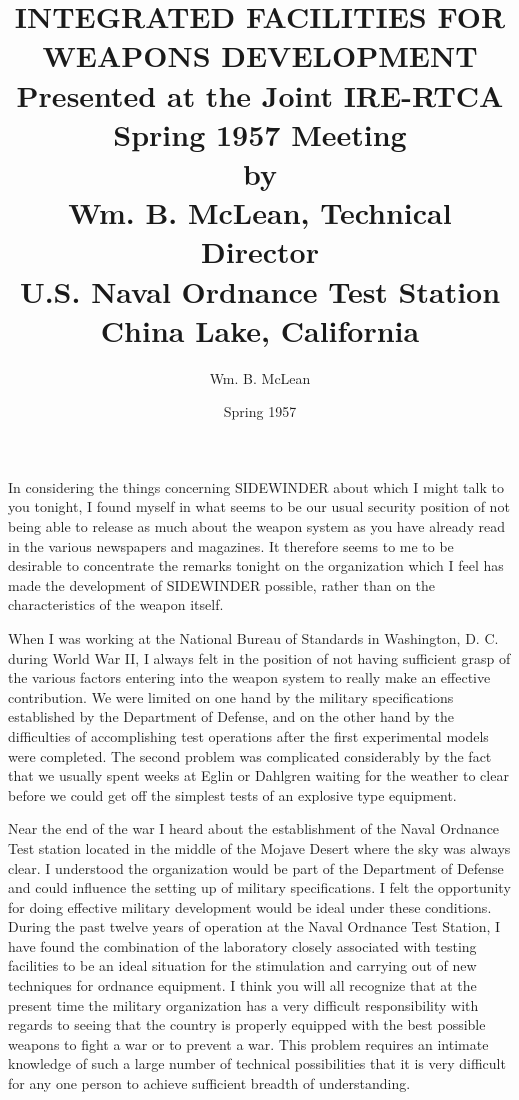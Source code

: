 \documentclass{memoir}
\title{%
  INTEGRATED FACILITIES FOR WEAPONS DEVELOPMENT \\
  \small Presented at the Joint IRE-RTCA Spring 1957 Meeting \\
         by \\
         Wm. B. McLean, Technical Director \\
         U.S. Naval Ordnance Test Station \\
         China Lake, California
}
\author{Wm. B. McLean}
\date{Spring 1957}
\begin{document}
\maketitle

In considering the things concerning SIDEWINDER about which I might talk to you tonight, I found myself in what seems to be our usual security position of not being able to release as much about the weapon system as you have already read in the various newspapers and magazines. It therefore seems to me to be desirable to concentrate the remarks tonight on the organization which I feel has made the development of SIDEWINDER possible, rather than on the characteristics of the weapon itself.

When I was working at the National Bureau of Standards in Washington, D. C. during World War II, I always felt in the position of not having sufficient grasp of the various factors entering into the weapon system to really make an effective contribution. We were limited on one hand by the military specifications established by the Department of Defense, and on the other hand by the difficulties of accomplishing test operations after the first experimental models were completed. The second problem was complicated considerably by the fact that we usually spent weeks at Eglin or Dahlgren waiting for the weather to clear before we could get off the simplest tests of an explosive type equipment.

Near the end of the war I heard about the establishment of the Naval Ordnance Test station located in the middle of the Mojave Desert where the sky was always clear. I understood the organization would be part of the Department of Defense and could influence the setting up of military specifications. I felt the opportunity for doing effective military development would be ideal under these conditions. During the past twelve years of operation at the Naval Ordnance Test Station, I have found the combination of the laboratory closely associated with testing facilities to be an ideal situation for the stimulation and carrying out of new techniques for ordnance equipment. I think you will all recognize that at the present time the military organization has a very difficult responsibility with regards to seeing that the country is properly equipped with the best possible weapons to fight a war or to prevent a war. This problem requires an intimate knowledge of such a large number of technical possibilities that it is very difficult for any one person to achieve sufficient breadth of understanding.
\end{document}

